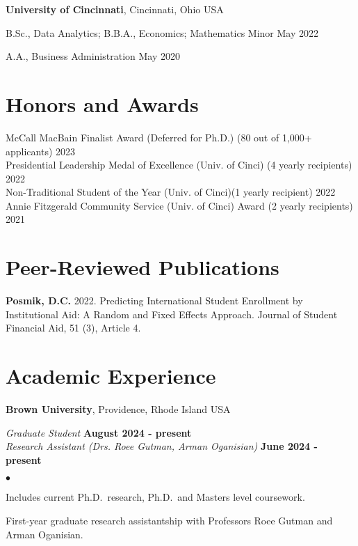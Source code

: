\documentclass[margin,line]{res}
\newenvironment{list1}{
  \begin{list}{\ding{113}}{%
      \setlength{\itemsep}{0in}
      \setlength{\parsep}{0in} \setlength{\parskip}{0in}
      \setlength{\topsep}{0in} \setlength{\partopsep}{0in} 
      \setlength{\leftmargin}{0.17in}}}{\end{list}}
\newenvironment{list2}{
  \begin{list}{$\bullet$}{%
      \setlength{\itemsep}{0in}
      \setlength{\parsep}{0in} \setlength{\parskip}{0in}
      \setlength{\topsep}{0in} \setlength{\partopsep}{0in} 
      \setlength{\leftmargin}{0.2in}}}{\end{list}}
\begin{document}
\begin{resume}
{\bf University of Cincinnati}, Cincinnati, Ohio USA\\
\vspace*{-.1in}
\begin{list1}
\item[] B.Sc., Data Analytics; B.B.A., Economics; Mathematics Minor \hfill May 2022
\item[] A.A., Business Administration \hfill May 2020
\end{list1}


\section{\sc Honors and Awards} 
McCall MacBain Finalist Award (Deferred for Ph.D.) (80 out of 1,000+ applicants) \hfill 2023 \\  
Presidential Leadership Medal of Excellence (Univ. of Cinci) (4 yearly recipients) \hfill 2022 \\ 
Non-Traditional Student of the Year (Univ. of Cinci)(1 yearly recipient) \hfill 2022 \\
Annie Fitzgerald Community Service (Univ. of Cinci) Award (2 yearly recipients) \hfill 2021


\section{\sc Peer-Reviewed Publications}
{\bf Posmik, D.C.} 2022. Predicting International Student Enrollment by Institutional Aid: A Random and Fixed Effects Approach. Journal of Student Financial Aid, 51 (3), Article 4.  


\section{\sc Academic Experience}
{\bf Brown University}, Providence, Rhode Island USA

\vspace{-.3cm}
{\em Graduate Student} \hfill {\bf August 2024 - present}\\
{\em Research Assistant (Drs. Roee Gutman, Arman Oganisian)} \hfill {\bf June 2024 - present}\\

\begin{list2}
\item Includes current Ph.D.~research, Ph.D.~and Masters level coursework. 
\item First-year graduate research assistantship with Professors Roee Gutman and Arman Oganisian.
\end{list2}


\end{resume}
\end{document}
